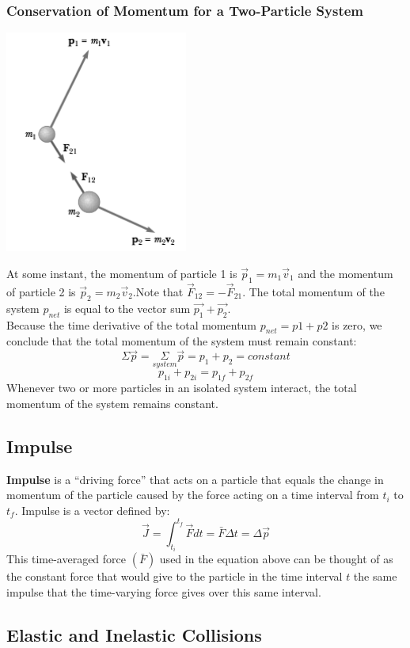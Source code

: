 \documentclass{article}
\begin{document}
\subsubsection{Conservation of Momentum for a Two-Particle System}
\begin{multicols}{2}
  \centerline{\includegraphics[width=6cm]{conMomentum.png}}
  \columnbreak
  At some instant, the momentum of particle 1 is $\vec{p}_1=m_1\vec{v}_1$ and the momentum of particle 2 is $\vec{p}_2=m_2\vec{v}_2$.Note that $\vec{F}_{12}=-\vec{F}_{21}$. The total momentum of the system $p_{net}$ is equal to the vector sum $\vec{p_1}+\vec{p_2}$.\\
  Because the time derivative of the total momentum $p_{net}=p1+p2$ is zero, we conclude that the total momentum of the system must remain constant:
  \[
  \Sigma\vec{p}=\underset{system}{\Sigma}\vec{p}=p_1+p_2=constant
  \]
  \[
  p_{1i}+p_{2i}=p_{1f}+p_{2f}
  \]
  Whenever two or more particles in an isolated system interact, the total momentum of the system remains constant.
\end{multicols}
\subsection{Impulse}
\textbf{Impulse} is a ``driving force'' that acts on a particle that equals the change in momentum of the particle caused by the force acting on a time interval from $t_i$ to $t_f$. Impulse is a vector defined by:
\[
\vec{J}=\int_{t_i}^{t_f} \vec{F} dt=\bar{F}\Delta t=\Delta\vec{p}
\]
This time-averaged force $(\bar{F})$ used in the equation above can be thought of as the constant force that would give to the particle in the time interval $t$ the same impulse that the time-varying force gives over this same interval.

\subsection{Elastic and Inelastic Collisions}
\end{document}
